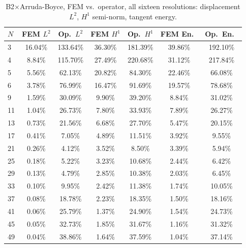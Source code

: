 \documentclass[11pt]{article}
\begin{document}
\begin{table}[h]
\centering
\caption{B2$\times$Arruda-Boyce, FEM vs.\ operator, all sixteen
  resolutions: displacement $L^2$, $H^1$ semi-norm, tangent energy.}
\label{tab:s2-b2ab-a}
\scriptsize
\begin{tabular}{lcccccc}
\toprule
$N$ & FEM $L^2$ & Op.\ $L^2$ & FEM $H^1$ & Op.\ $H^1$ & FEM En.\ & Op.\ En.\ \\
\midrule
3  & 16.04\% & 133.64\% & 36.30\% & 181.39\% & 39.86\% & 192.10\% \\
4  & 8.84\%  & 115.70\% & 27.49\% & 220.68\% & 31.12\% & 217.84\% \\
5  & 5.56\%  & 62.13\%  & 20.82\% & 84.30\%  & 22.46\% & 66.08\%  \\
6  & 3.78\%  & 76.99\%  & 16.47\% & 91.69\%  & 19.57\% & 78.68\%  \\
9  & 1.59\%  & 30.09\%  & 9.90\%  & 39.20\%  & 8.84\%  & 31.02\%  \\
11 & 1.04\%  & 26.73\%  & 7.80\%  & 33.93\%  & 7.89\%  & 26.27\%  \\
13 & 0.73\%  & 21.56\%  & 6.68\%  & 27.70\%  & 5.47\%  & 20.15\%  \\
17 & 0.41\%  & 7.05\%   & 4.89\%  & 11.51\%  & 3.92\%  & 9.55\%   \\
21 & 0.26\%  & 4.12\%   & 3.52\%  & 8.50\%   & 3.39\%  & 5.94\%   \\
25 & 0.18\%  & 5.22\%   & 3.23\%  & 10.68\%  & 2.44\%  & 6.42\%   \\
29 & 0.13\%  & 4.79\%   & 2.85\%  & 10.38\%  & 2.03\%  & 6.45\%   \\
33 & 0.10\%  & 9.95\%   & 2.42\%  & 11.38\%  & 1.74\%  & 10.05\%  \\
37 & 0.08\%  & 18.78\%  & 2.23\%  & 18.35\%  & 1.50\%  & 18.16\%  \\
41 & 0.06\%  & 25.79\%  & 1.37\%  & 24.90\%  & 1.54\%  & 24.73\%  \\
45 & 0.05\%  & 32.73\%  & 1.85\%  & 31.67\%  & 1.16\%  & 31.32\%  \\
49 & 0.04\%  & 38.86\%  & 1.64\%  & 37.59\%  & 1.04\%  & 37.14\%  \\
\bottomrule
\end{tabular}
\end{table}
\end{document}
